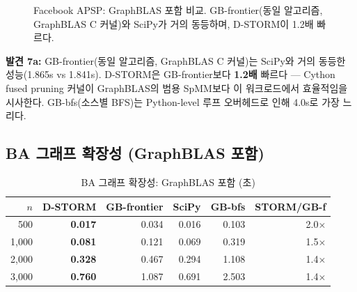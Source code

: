 \documentclass[11pt,a4paper]{article}
\begin{document}
\begin{figure}[ht]
\centering
{}
\caption{Facebook APSP: GraphBLAS 포함 비교. GB-frontier(동일 알고리즘, GraphBLAS C 커널)와 SciPy가 거의 동등하며, D-STORM이 1.2배 빠르다.}
\label{fig:fb-gb}
\end{figure}

\textbf{발견 7a:} GB-frontier(동일 알고리즘, GraphBLAS C 커널)는 SciPy와 거의 동등한 성능(1.865s vs 1.841s). D-STORM은 GB-frontier보다 \textbf{1.2배} 빠르다 --- Cython fused pruning 커널이 GraphBLAS의 범용 SpMM보다 이 워크로드에서 효율적임을 시사한다. GB-bfs(소스별 BFS)는 Python-level 루프 오버헤드로 인해 4.0s로 가장 느리다.

\subsection{BA 그래프 확장성 (GraphBLAS 포함)}

\begin{table}[ht]\centering
\caption{BA 그래프 확장성: GraphBLAS 포함 (초)}
\begin{tabular}{@{}rrrrrr@{}}
\toprule
$n$ & \textbf{D-STORM} & \textbf{GB-frontier} & \textbf{SciPy} & \textbf{GB-bfs} & \textbf{STORM/GB-f} \\
\midrule
500 & \textbf{0.017} & 0.034 & 0.016 & 0.103 & 2.0$\times$ \\
1,000 & \textbf{0.081} & 0.121 & 0.069 & 0.319 & 1.5$\times$ \\
2,000 & \textbf{0.328} & 0.467 & 0.294 & 1.108 & 1.4$\times$ \\
3,000 & \textbf{0.760} & 1.087 & 0.691 & 2.503 & 1.4$\times$ \\
\bottomrule
\end{tabular}
\end{table}
\end{document}
